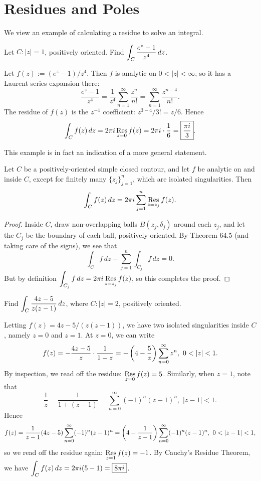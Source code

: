 \documentclass{article}
\begin{document}
\section{Residues and Poles}
We view an example of calculating a residue to solve an integral.
\begin{example}
Let $C: |z|=1$, positively oriented. Find $\displaystyle\int_C \frac{e^z-1}{z^4}\, dz$.
\end{example}
\begin{solution}
Let $f(z) := (e^z-1)/z^4$. Then $f$ is analytic on $0 < |z| < \infty$, so it has a Laurent series expansion there:
$$\frac{e^z-1}{z^4} = \frac 1{z^4}\sum_{n=1}^\infty \frac{z^n}{n!} = \sum_{n=1}^\infty \frac{z^{n-4}}{n!}.$$
The residue of $f(z)$ is the $z^{-1}$ coefficient: $z^{3-4}/3! = z/6$. Hence
$$\int_C f(z)\, dz = 2\pi i \operatorname*{Res}_{z=0} f(z) = 2\pi i\cdot\frac 16 = \boxed{\frac{\pi i}3}.$$
\end{solution}
This example is in fact an indication of a more general statement.
\begin{theorem}
Let $C$ be a positively-oriented simple closed contour, and let $f$ be analytic on and inside $C$, except for finitely many $\{z_j\}_{j=1}^n$, which are isolated singularities. Then
$$\int_C f(z)\, dz = 2\pi i \sum_{j=1}^n \operatorname*{Res}_{z= z_j} f(z).$$
\end{theorem}
\begin{proof}
Inside $C$, draw non-overlapping balls $B(z_j, \delta_j)$ around each $z_j$, and let the $C_j$ be the boundary of each ball, positively oriented. By Theorem 64.5 (and taking care of the signs), we see that
$$\int_C f\, dz - \sum_{j=1}^n\int_{C_j} f\, dz = 0.$$
\newpage
But by definition $\displaystyle\int_{C_j} f\, dz = 2\pi i\operatorname*{Res}_{z = z_j} f(z)$, so this completes the proof.
\end{proof}
\begin{example}
Find $\displaystyle\int_C \frac{4z-5}{z(z-1)}\, dz$, where $C: |z|=2$, positively oriented.
\end{example}
\begin{solution}
Letting $f(z) = 4z-5/(z(z-1))$, we have two isolated singularities inside $C$, namely $z=0$ and $z=1$. At $z=0$, we can write
$$f(z) =  -\frac{4z-5}{z} \cdot \frac 1{1-z} = -\left(4 - \frac 5z \right)\sum_{n=0}^\infty z^n,\,\, 0 < |z| < 1.$$
By inspection, we read off the residue: $\displaystyle\operatorname*{Res}_{ z=0} f(z) = 5$. Similarly, when $z=1$, note that
$$\frac 1z= \frac 1{1+(z-1)} = \sum_{n=0}^\infty (-1)^n(z-1)^n,\,\, |z-1|<1.$$
Hence
$$f(z) = \frac 1{z-1}(4z-5)\sum_{n=0}^\infty (-1)^n (z-1)^n = \left(4 - \frac 1{z-1} \right)\sum_{n=0}^\infty (-1)^n(z-1)^n, \,\, 0 < |z-1| < 1,$$
so we read off the residue again: $\displaystyle\operatorname*{Res}_{z=1} f(z) = -1$. By Cauchy's Residue Theorem, we have $\displaystyle\int_C f(z)\, dz = 2\pi i(5-1) = \boxed{8\pi i}$.
\end{solution}
\end{document}
